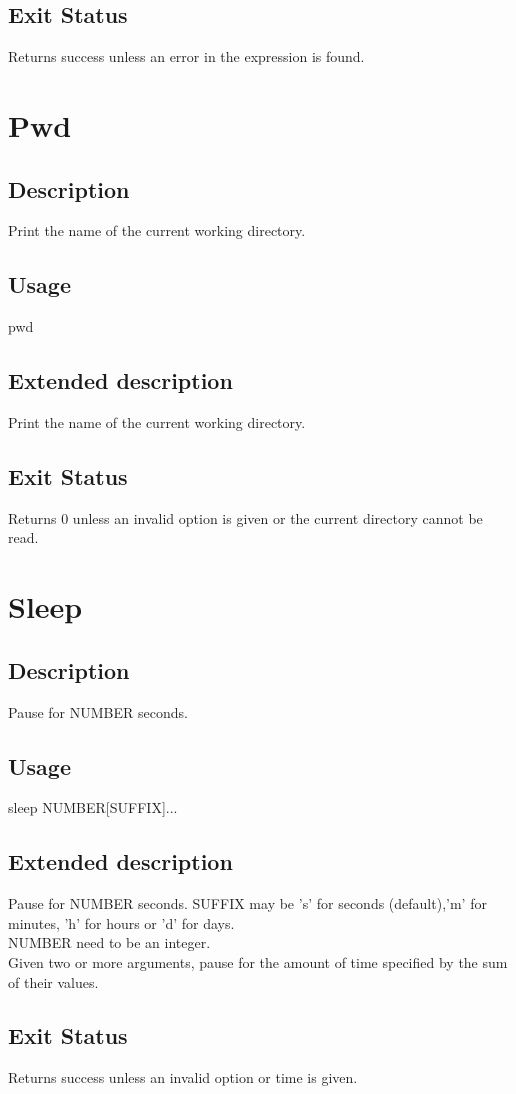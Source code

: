 \documentclass[12pt,a4paper]{report}
\begin{document}
\section{Exit Status}
Returns success unless an error in the expression is found.
\newpage

\chapter{Pwd}
\section{Description}
Print the name of the current working directory.
\section{Usage}
pwd
\section{Extended description}
Print the name of the current working directory.
\section{Exit Status}
Returns 0 unless an invalid option is given or the current directory cannot be read.
\newpage

\chapter{Sleep}
\section{Description}
Pause for NUMBER seconds.
\section{Usage}
sleep NUMBER[SUFFIX]...
\section{Extended description}
Pause for NUMBER seconds.  SUFFIX may be 's' for seconds (default),'m' for minutes, 'h' for hours or 'd' for days.\\
NUMBER need to be an integer.\\
Given two or more arguments, pause for the amount of time specified by the sum of their values.
\section{Exit Status}
Returns success unless an invalid option or time is given.
\newpage
\end{document}
